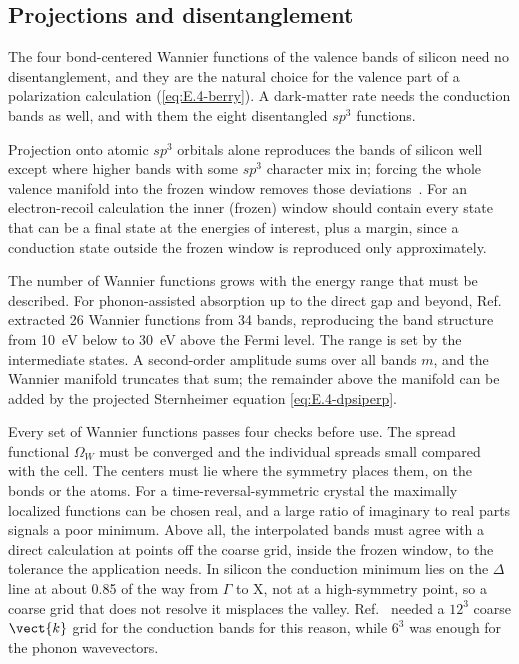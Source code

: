 \subsection{Projections and disentanglement}

The four bond-centered Wannier functions of the valence bands of silicon need no disentanglement, and they are the natural choice for the valence part of a polarization calculation (\cref{eq:E.4-berry}). A dark-matter rate needs the conduction bands as well, and with them the eight disentangled $sp^3$ functions.

Projection onto atomic $sp^3$ orbitals alone reproduces the bands of silicon well except where higher bands with some $sp^3$ character mix in; forcing the whole valence manifold into the frozen window removes those deviations~\cite[Fig.~5]{marzari2012maximally}. For an electron-recoil calculation the inner (frozen) window should contain every state that can be a final state at the energies of interest, plus a margin, since a conduction state outside the frozen window is reproduced only approximately.

The number of Wannier functions grows with the energy range that must be described. For phonon-assisted absorption up to the direct gap and beyond, Ref.~\cite{noffsinger2012phonon} extracted 26 Wannier functions from 34 bands, reproducing the band structure from \SI{10}{eV} below to \SI{30}{eV} above the Fermi level. The range is set by the intermediate states. A second-order amplitude sums over all bands $m$, and the Wannier manifold truncates that sum; the remainder above the manifold can be added by the projected Sternheimer equation \cref{eq:E.4-dpsiperp}.

Every set of Wannier functions passes four checks before use. The spread functional $\Omega_W$ must be converged and the individual spreads small compared with the cell. The centers must lie where the symmetry places them, on the bonds or the atoms. For a time-reversal-symmetric crystal the maximally localized functions can be chosen real, and a large ratio of imaginary to real parts signals a poor minimum. Above all, the interpolated bands must agree with a direct calculation at points off the coarse grid, inside the frozen window, to the tolerance the application needs. In silicon the conduction minimum lies on the $\Delta$ line at about 0.85 of the way from $\Gamma$ to X, not at a high-symmetry point, so a coarse grid that does not resolve it misplaces the valley. Ref.~\cite{ponce2018towards} needed a $12^3$ coarse $\vect{k}$ grid for the conduction bands for this reason, while $6^3$ was enough for the phonon wavevectors.

